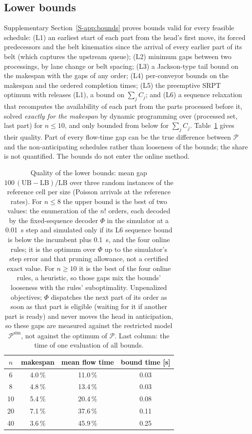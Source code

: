 \documentclass[11pt,a4paper]{article}
\theoremstyle{plain}
\theoremstyle{definition}
\theoremstyle{remark}
\newcommand{\Pb}{\mathcal{P}}
\newcommand{\Psim}{\Pb^{\mathrm{sim}}}
\newcommand{\Supp}[1]{Supplementary Section~\ref{S-#1}}
\begin{document}
\subsection{Lower bounds}\label{sec:bounds}
\Supp{app:bounds} proves bounds valid for every feasible schedule: (L1) an earliest start
of each part from the head's first move, its forced predecessors and the belt kinematics
since the arrival of every earlier part of its belt (which captures the upstream queue);
(L2) minimum gaps between two processings, by lane change or belt spacing; (L3) a
Jackson-type tail bound on the makespan with the gaps of any order; (L4) per-conveyor
bounds on the makespan and the ordered completion times; (L5) the preemptive SRPT
optimum \cite{Schrage1968,Baker1974} with releases (L1), a bound on $\sum_jC_j$; and (L6) a
sequence relaxation that recomputes the availability of each part from the parts processed
before it, solved \emph{exactly for the makespan} by dynamic programming over (processed
set, last part) for $n\le10$, and only bounded from below for $\sum_jC_j$. Table~\ref{tab:bounds}
gives their quality. Part of every flow-time gap can be the true difference between $\Pb$
and the non-anticipating schedules rather than looseness of the bounds; the share is not
quantified. The bounds do not enter the online method.

\begin{table}[t]
\centering\small
\caption{Quality of the lower bounds: mean gap $100\,(\mathrm{UB}-\mathrm{LB})/\mathrm{LB}$
over three random instances of the reference cell per size (Poisson arrivals at the
reference rates). For $n\le8$ the upper bound is the best of two values: the enumeration of
the $n!$ orders, each decoded by the fixed-sequence decoder $\Phi$ in the simulator at a
0.01~s step and simulated only if its L6 sequence bound is below the incumbent plus 0.1~s,
and the four online rules; it is the optimum over $\Phi$ up to the simulator's step error
and that pruning allowance, not a certified exact value. For $n\ge10$ it is the best of the
four online rules, a heuristic, so those gaps mix the bounds' looseness with the rules'
suboptimality. Unpenalized objectives; $\Phi$ dispatches the next part of its order as soon
as that part is eligible (waiting for it if another part is ready) and never moves the head
in anticipation, so these gaps are measured against the restricted model $\Psim$, not
against the optimum of $\Pb$. Last column: the time of one evaluation of all bounds.}
\label{tab:bounds}
\begin{tabular}{@{}cccc@{}}
\toprule
$n$ & makespan & mean flow time & bound time [s]\\
\midrule
6 & 4.0\,\% & 11.0\,\% & 0.03\\
8 & 4.8\,\% & 13.4\,\% & 0.03\\
10 & 5.4\,\% & 20.4\,\% & 0.08\\
20 & 7.1\,\% & 37.6\,\% & 0.11\\
40 & 3.6\,\% & 45.9\,\% & 0.25\\
\bottomrule
\end{tabular}
\end{table}
\end{document}
